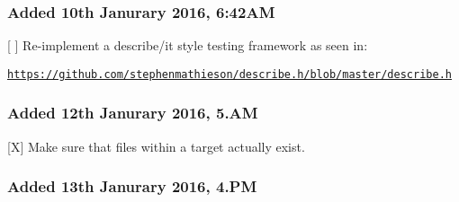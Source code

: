 \subsubsection*{Added 10th Janurary 2016, 6\+:42\+AM}


\begin{DoxyItemize}
\item \mbox{[} \mbox{]} Re-\/implement a {\ttfamily describe/it} style testing framework as seen in\+:
\begin{DoxyItemize}
\item \href{https://github.com/stephenmathieson/describe.h/blob/master/describe.h}{\tt https\+://github.\+com/stephenmathieson/describe.\+h/blob/master/describe.\+h}
\end{DoxyItemize}
\end{DoxyItemize}

\subsubsection*{Added 12th Janurary 2016, 5.\+AM}


\begin{DoxyItemize}
\item \mbox{[}X\mbox{]} Make sure that files within a target actually exist.
\end{DoxyItemize}

\subsubsection*{Added 13th Janurary 2016, 4.\+PM}


